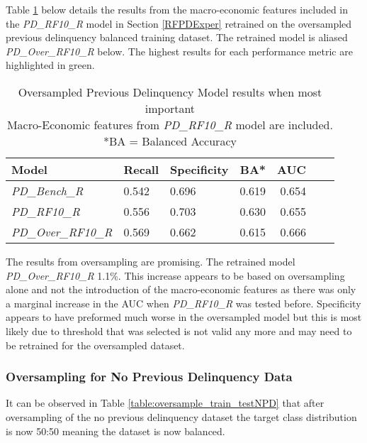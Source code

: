 Table \ref{table:overPD} below details the results from the macro-economic features included in the \textit{PD\_RF10\_R} model in Section \ref{RFPDExper} retrained on the oversampled previous delinquency balanced training dataset. The retrained model is aliased \textit{PD\_Over\_RF10\_R} below. The highest results for each performance metric are highlighted in green.

\begin{table}[H]
	\centering
	\small
		\begin{tabular}{l l l r r r r}
			\hline
			\textbf{Model} & \textbf{Recall} & \textbf{Specificity} & \textbf{BA*} & \textbf{AUC}  \\ \hline
			\textit{PD\_Bench\_R} & 0.542 & 0.696 & 0.619 & 0.654 \\ \hline
			\textit{PD\_RF10\_R} & 0.556 & \cellcolor{green!25}0.703 & \cellcolor{green!25}0.630 & 0.655  \\ 
			\textit{PD\_Over\_RF10\_R}  & \cellcolor{green!25}0.569 & 0.662 & 0.615 & \cellcolor{green!25}0.666   \\ \hline
		\end{tabular}
	\caption{{Oversampled Previous Delinquency Model results when most important\\
			Macro-Economic features from \textit{PD\_RF10\_R} model are included.
			\\ *BA = Balanced Accuracy}}
	\label{table:overPD}
\end{table}

The results from oversampling are promising. The retrained model \textit{PD\_Over\_RF10\_R} 1.1\%. This increase appears to be based on oversampling alone and not the introduction of the macro-economic features as there was only a marginal increase in the AUC when \textit{PD\_RF10\_R} was tested before. Specificity appears to have preformed much worse in the oversampled model but this is most likely due to threshold that was selected is not valid any more and may need to be retrained for the oversampled dataset. 

\subsubsection{Oversampling for No Previous Delinquency Data}

It can be observed in Table \ref{table:oversample_train_testNPD} that after oversampling of the no previous delinquency dataset the target class distribution is now 50:50 meaning the dataset is now balanced.


